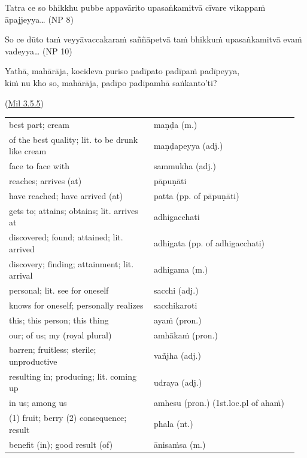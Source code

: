 \documentclass[11pt,oneside]{memoir}
\begin{document}
\bigskip

Tatra ce so bhikkhu pubbe appavārito upasaṅkamitvā cīvare vikappaṁ āpajjeyya\ldots{} (NP 8)

\bigskip

So ce dūto taṁ veyyāvaccakaraṁ saññāpetvā taṁ bhikkuṁ upasaṅkamitvā evaṁ vadeyya\ldots{} (NP 10)

\bigskip

Yathā, mahārāja, kocideva puriso padīpato padīpaṁ padīpeyya, \\[0pt]
kiṁ nu kho so, mahārāja, padīpo padīpamhā saṅkanto'ti?

(\href{https://suttacentral.net/mil3.5.5/pli/ms}{Mil 3.5.5})

\clearpage

\begin{longtable}{L{0.48\linewidth} L{0.48\linewidth}}
best part; cream & maṇḍa (m.)\\[0pt]
of the best quality; lit. to be drunk like cream & maṇḍapeyya (adj.)\\[0pt]
face to face with & sammukha (adj.)\\[0pt]
reaches; arrives (at) & pāpuṇāti\\[0pt]
have reached; have arrived (at) & patta (pp. of pāpuṇāti)\\[0pt]
gets to; attains; obtains; lit. arrives at & adhigacchati\\[0pt]
discovered; found; attained; lit. arrived & adhigata (pp. of adhigacchati)\\[0pt]
discovery; finding; attainment; lit. arrival & adhigama (m.)\\[0pt]
personal; lit. see for oneself & sacchi (adj.)\\[0pt]
knows for oneself; personally realizes & sacchikaroti\\[0pt]
this; this person; this thing & ayaṁ (pron.)\\[0pt]
our; of us; my (royal plural) & amhākaṁ (pron.)\\[0pt]
barren; fruitless; sterile; unproductive & vañjha (adj.)\\[0pt]
resulting in; producing; lit. coming up & udraya (adj.)\\[0pt]
in us; among us & amhesu (pron.) (1st.loc.pl of ahaṁ)\\[0pt]
(1) fruit; berry (2) consequence; result & phala (nt.)\\[0pt]
benefit (in); good result (of) & ānisaṁsa (m.)\\[0pt]
\end{longtable}
\end{document}
